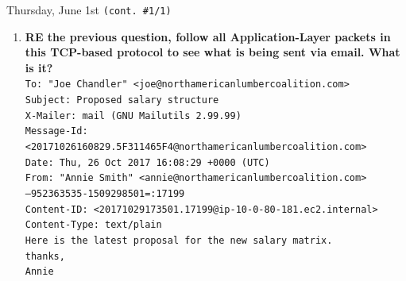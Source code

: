 \documentclass[11pt]{article}
\newcommand\codebox[1]{
    \noindent\hspace{-0.25em}\begin{tcolorbox}[on line, hbox, colback = codeblack, colframe = codeborder, coltext = white, boxrule = 1.5pt, left = 2pt, right = 2pt, top = 0.5pt, bottom = 0.5pt]
    \small\texttt{#1}\normalsize
    \end{tcolorbox}\hspace{-0.25em}
}
\begin{document}
\begin{bloodorangebox}{Thursday, June 1st \hspace{0.2cm}\texttt{(cont. \#1/1)}\vspace{-2.2em}\begin{flushright}\large {}\end{flushright}}
\begin{itemize}
\begin{enumerate}
            \vspace{-1em}
            Over HTTP, packets' ``info" section all start with either \texttt{GET}, \texttt{HTTP}, or \texttt{POST}: the user clicking hyperlinks, the mail server loading those pages (\textbackslash\texttt{webmail}), and the user posting mail (\textbackslash\texttt{compose.php}) in php. When user sends mail to others, SMTP (Simple Mail Transfer Protocol) is used. This was discovered using \codebox{ip.addr == 10.0.0.41 \&\& smtp}, and following the TCP Stream of any packet.
            \item \textbf{RE the previous question, follow all Application-Layer packets in this TCP-based protocol to see what is being sent via email. What is it?} \\
        
            \vspace{-1em}
            \scriptsize{\texttt{To: "Joe Chandler" <joe@northamericanlumbercoalition.com> \\
            Subject: Proposed salary structure \\
            X-Mailer: mail (GNU Mailutils 2.99.99) \\
            Message-Id: <20171026160829.5F311465F4@northamericanlumbercoalition.com> \\
            Date: Thu, 26 Oct 2017 16:08:29 +0000 (UTC) \\
            From: "Annie Smith" <annie@northamericanlumbercoalition.com>\\
            --952363535-1509298501=:17199 \\
            Content-ID: <20171029173501.17199@ip-10-0-80-181.ec2.internal> \\
            Content-Type: text/plain\\
            Here is the latest proposal for the new salary matrix. \\
            thanks,\\
            Annie}}
        \end{enumerate}
    \end{itemize}
\end{bloodorangebox}

\begin{center}
    \vspace{-0.25em}
    \hspace{0.2cm}
    \vspace{-0.4em}
\end{center}
\end{document}
